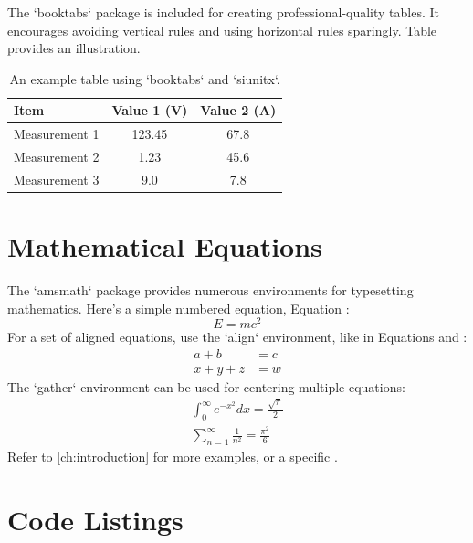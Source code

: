 The `booktabs` package is included for creating professional-quality tables. It encourages avoiding vertical rules and using horizontal rules sparingly.
Table  provides an illustration.

\begin{table}[htbp]
    \centering
    \caption{An example table using `booktabs` and `siunitx`.}
    \label{tab:example_table_siunitx}
    \begin{tabular}{lS[table-format=3.2]S[table-format=2.1]}
        \toprule
        {Item} & {Value 1 (\si{\volt})} & {Value 2 (\si{\ampere})} \\
        \midrule
        Measurement 1 & 123.45 & 67.8 \\
        Measurement 2 & 1.23 & 45.6 \\
        Measurement 3 & 9.0 & 7.8 \\
        \bottomrule
    \end{tabular}
\end{table}

\section{Mathematical Equations}
\label{sec:equations}

The `amsmath` package provides numerous environments for typesetting mathematics.
Here's a simple numbered equation, Equation :
\begin{equation}
    E = mc^2
    \label{eq:einstein}
\end{equation}
For a set of aligned equations, use the `align` environment, like in Equations  and :
\begin{align}
    a + b &= c \label{eq:align_start} \\
    x + y + z &= w \label{eq:align_end}
\end{align}
The `gather` environment can be used for centering multiple equations:
\begin{gather}
    \int_0^\infty e^{-x^2} dx = \frac{\sqrt{\pi}}{2} \label{eq:gaussian_integral} \\
    \sum_{n=1}^\infty \frac{1}{n^2} = \frac{\pi^2}{6} \label{eq:basel_problem}
\end{gather}
Refer to \cref{ch:introduction} for more examples, or a specific .

\section{Code Listings}
\label{sec:code}

